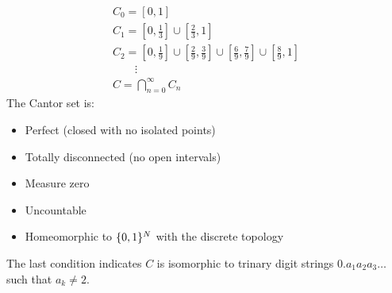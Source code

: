\documentclass[letterpaper,12pt,fleqn]{article}
\begin{document}
\begin{example}
  \begin{gather*}
    C_0=[0,1] \\
    C_1=[0,\frac{1}{3}]\cup[\frac{2}{3},1] \\
    C_2=[0,\frac{1}{9}]\cup[\frac{2}{9},\frac{3}{9}]\cup[\frac{6}{9},\frac{7}{9}]\cup[\frac{8}{9},1] \\
    \qquad\vdots \\
    C=\bigcap_{n=0}^{\infty}C_n
  \end{gather*}
  The Cantor set is:
  \begin{itemize}
  \item Perfect (closed with no isolated points)
  \item Totally disconnected (no open intervals)
  \item Measure zero
  \item Uncountable
  \item Homeomorphic to \(\{0,1\}^N\) with the discrete topology
  \end{itemize}

  The last condition indicates \(C\) is isomorphic to trinary digit strings \(0.a_1a_2a_3\ldots\) such that
  \(a_k\ne2\).
\end{example}
\end{document}
